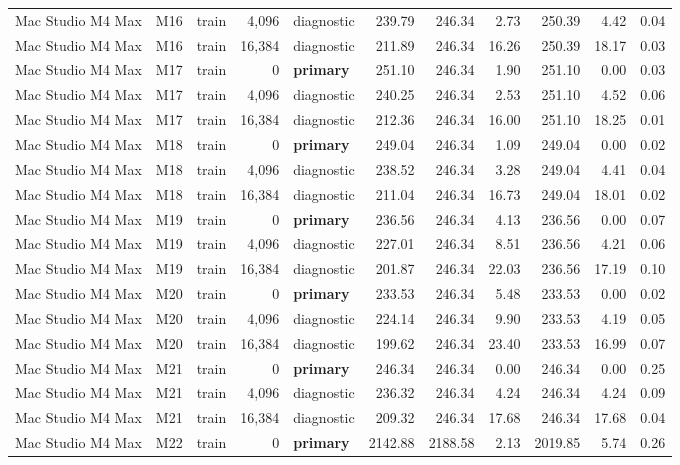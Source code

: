\documentclass[10pt]{article}
\begin{document}
\begin{landscape}
\begin{longtable}{@{}l l l r l r r r r r r@{}}
Mac Studio M4 Max & M16 & train & 4,096 & diagnostic & 239.79 & 246.34 & 2.73 & 250.39 & 4.42 & 0.04 \\
Mac Studio M4 Max & M16 & train & 16,384 & diagnostic & 211.89 & 246.34 & 16.26 & 250.39 & 18.17 & 0.03 \\
Mac Studio M4 Max & M17 & train & 0 & \textbf{primary} & 251.10 & 246.34 & 1.90 & 251.10 & 0.00 & 0.03 \\
Mac Studio M4 Max & M17 & train & 4,096 & diagnostic & 240.25 & 246.34 & 2.53 & 251.10 & 4.52 & 0.06 \\
Mac Studio M4 Max & M17 & train & 16,384 & diagnostic & 212.36 & 246.34 & 16.00 & 251.10 & 18.25 & 0.01 \\
Mac Studio M4 Max & M18 & train & 0 & \textbf{primary} & 249.04 & 246.34 & 1.09 & 249.04 & 0.00 & 0.02 \\
Mac Studio M4 Max & M18 & train & 4,096 & diagnostic & 238.52 & 246.34 & 3.28 & 249.04 & 4.41 & 0.04 \\
Mac Studio M4 Max & M18 & train & 16,384 & diagnostic & 211.04 & 246.34 & 16.73 & 249.04 & 18.01 & 0.02 \\
Mac Studio M4 Max & M19 & train & 0 & \textbf{primary} & 236.56 & 246.34 & 4.13 & 236.56 & 0.00 & 0.07 \\
Mac Studio M4 Max & M19 & train & 4,096 & diagnostic & 227.01 & 246.34 & 8.51 & 236.56 & 4.21 & 0.06 \\
Mac Studio M4 Max & M19 & train & 16,384 & diagnostic & 201.87 & 246.34 & 22.03 & 236.56 & 17.19 & 0.10 \\
Mac Studio M4 Max & M20 & train & 0 & \textbf{primary} & 233.53 & 246.34 & 5.48 & 233.53 & 0.00 & 0.02 \\
Mac Studio M4 Max & M20 & train & 4,096 & diagnostic & 224.14 & 246.34 & 9.90 & 233.53 & 4.19 & 0.05 \\
Mac Studio M4 Max & M20 & train & 16,384 & diagnostic & 199.62 & 246.34 & 23.40 & 233.53 & 16.99 & 0.07 \\
Mac Studio M4 Max & M21 & train & 0 & \textbf{primary} & 246.34 & 246.34 & 0.00 & 246.34 & 0.00 & 0.25 \\
Mac Studio M4 Max & M21 & train & 4,096 & diagnostic & 236.32 & 246.34 & 4.24 & 246.34 & 4.24 & 0.09 \\
Mac Studio M4 Max & M21 & train & 16,384 & diagnostic & 209.32 & 246.34 & 17.68 & 246.34 & 17.68 & 0.04 \\
Mac Studio M4 Max & M22 & train & 0 & \textbf{primary} & 2142.88 & 2188.58 & 2.13 & 2019.85 & 5.74 & 0.26 \\

\end{longtable}
\end{landscape}
\end{document}
